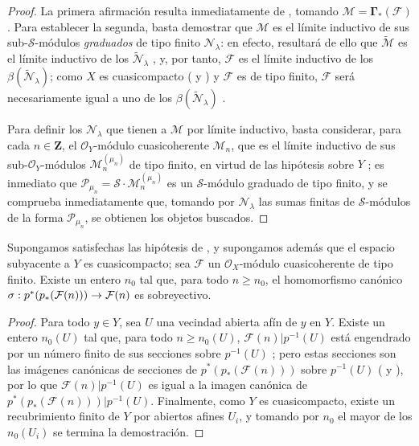 \documentclass[oneside,10pt]{amsart}
\makeatletter
\renewcommand{\geq}{\geqslant}
\newcommand{\ega@arrow}[2]{\mathchoice{#1}{#2}{#2}{#2}}
\renewcommand{\to}{\ega@arrow{\longrightarrow}{\rightarrow}}
\newcommand{\oldpage}[2][]{\marginnote{\normalfont\footnotesize\textbf{#1}~|~#2}\ignorespaces}
\let\EGAOriginalLabel\label
\renewcommand{\label}[1]{\phantomsection\EGAOriginalLabel{#1}}
\makeatother
\begin{document}
\oldpage[II]{60}
\begin{proof}
La primera afirmación resulta inmediatamente de , tomando $\mathcal{M}=\mathbf{\Gamma}_*(\mathcal{F})$.
Para establecer la segunda, basta demostrar que $\mathcal{M}$ es el límite inductivo de sus sub-$\mathcal{S}$-módulos \emph{graduados} de tipo finito $\mathcal{N}_\lambda$: en efecto, resultará de ello que $\widetilde{\mathcal{M}}$ es el límite inductivo de los $\widetilde{\mathcal{N}}_\lambda$ , y, por tanto, $\mathcal{F}$ es el límite inductivo de los $\beta(\widetilde{\mathcal{N}}_\lambda)$; como $X$ es cuasicompacto ( y ) y $\mathcal{F}$ es de tipo finito, $\mathcal{F}$ será necesariamente igual a uno de los $\beta(\widetilde{\mathcal{N}}_\lambda)$ .

Para definir los $\mathcal{N}_\lambda$ que tienen a $\mathcal{M}$ por límite inductivo, basta considerar, para cada $n\in\mathbf{Z}$, el $\mathcal{O}_Y$-módulo cuasicoherente $\mathcal{M}_n$, que es el límite inductivo de sus sub-$\mathcal{O}_Y$-módulos $\mathcal{M}_n^{(\mu_n)}$ de tipo finito, en virtud de las hipótesis sobre $Y$ ; es inmediato que $\mathcal{P}_{\mu_n}=\mathcal{S}\cdot\mathcal{M}_n^{(\mu_n)}$ es un $\mathcal{S}$-módulo graduado de tipo finito, y se comprueba inmediatamente que, tomando por $\mathcal{N}_\lambda$ las sumas finitas de $\mathcal{S}$-módulos de la forma $\mathcal{P}_{\mu_n}$, se obtienen los objetos buscados.
\end{proof}

\begin{corollary}[3.4.6]
\label{II.3.4.6-fr}
Supongamos satisfechas las hipótesis de , y supongamos además que el espacio subyacente a $Y$ es cuasicompacto; sea $\mathcal{F}$ un $\mathcal{O}_X$-módulo cuasicoherente de tipo finito.
Existe un entero $n_0$ tal que, para todo $n\geq n_0$, el homomorfismo canónico
$\sigma:p^*(p_*(\mathcal{F}(n)))\to\mathcal{F}(n)$
 es sobreyectivo.
\end{corollary}

\begin{proof}
Para todo $y\in Y$, sea $U$ una vecindad abierta afín de $y$ en $Y$.
Existe un entero $n_0(U)$ tal que, para todo $n\geq n_0(U)$, $\mathcal{F}(n)|p^{-1}(U)$ está engendrado por un número finito de sus secciones sobre $p^{-1}(U)$ ; pero estas secciones son las imágenes canónicas de secciones de $p^*(p_*(\mathcal{F}(n)))$ sobre $p^{-1}(U)$ ( y ), por lo que $\mathcal{F}(n)|p^{-1}(U)$ es igual a la imagen canónica de $p^*(p_*(\mathcal{F}(n)))|p^{-1}(U)$.
Finalmente, como $Y$ es cuasicompacto, existe un recubrimiento finito de $Y$ por abiertos afines $U_i$, y tomando por $n_0$ el mayor de los $n_0(U_i)$ se termina la demostración.
\end{proof}
\end{document}
